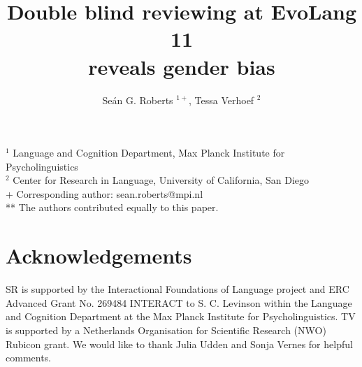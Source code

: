 \documentclass[12pt]{article}
\title{Double blind reviewing at EvoLang 11\\reveals gender bias}
\author{Se\'{a}n G. Roberts $^{1+}$, Tessa Verhoef $^2$}
\date{} %
\begin{document}
\maketitle
%
%
\noindent $^1$ Language and Cognition Department, Max Planck Institute for Psycholinguistics\\
$^2$ Center for Research in Language, University of California, San Diego\\
+ Corresponding author: sean.roberts@mpi.nl\\
** The authors contributed equally to this paper.


\section*{Acknowledgements}
SR is supported by the Interactional Foundations of Language project and ERC Advanced Grant No. 269484 INTERACT to S. C. Levinson within the Language and Cognition Department at the Max Planck Institute for Psycholinguistics.  TV is supported by a Netherlands Organisation for Scientific Research (NWO) Rubicon grant. We would like to thank Julia Udden and Sonja Vernes for helpful comments.

 
\end{document}
